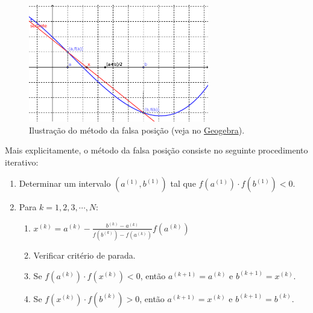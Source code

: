 \begin{figure}[h!]
  \centering
  \includegraphics[width=0.7\textwidth]{./cap_eq1d/dados/fig_falsapos/fig_falsapos}
  \caption{Ilustração do método da falsa posição (veja no \href{https://github.com/phkonzen/notas/blob/master/src/MatematicaNumerica/cap_eq1d/dados/fig_falsapos/fig_falsapos.ggb}{Geogebra}).}
  \label{fig:falsapos}
\end{figure}

Mais explicitamente, o método da falsa posição consiste no seguinte procedimento iterativo:
\begin{enumerate}
\item Determinar um intervalo $(a^{(1)}, b^{(1)})$ tal que $f(a^{(1)})\cdot f(b^{(1)}) < 0$.
\item Para $k = 1, 2, 3, \cdots, N$:
  \begin{enumerate}[2.1]
  \item $\displaystyle x^{(k)} = a^{(k)} - \frac{b^{(k)}-a^{(k)}}{f(b^{(k)})-f(a^{(k)})}f(a^{(k)})$
  \item Verificar critério de parada.
  \item Se $f(a^{(k)})\cdot f(x^{(k)}) < 0$, então $a^{(k+1)}=a^{(k)}$ e $b^{(k+1)}=x^{(k)}$.
  \item Se $f(x^{(k)})\cdot f(b^{(k)}) > 0$, então $a^{(k+1)}=x^{(k)}$ e $b^{(k+1)}=b^{(k)}$.
  \end{enumerate}
\end{enumerate}

